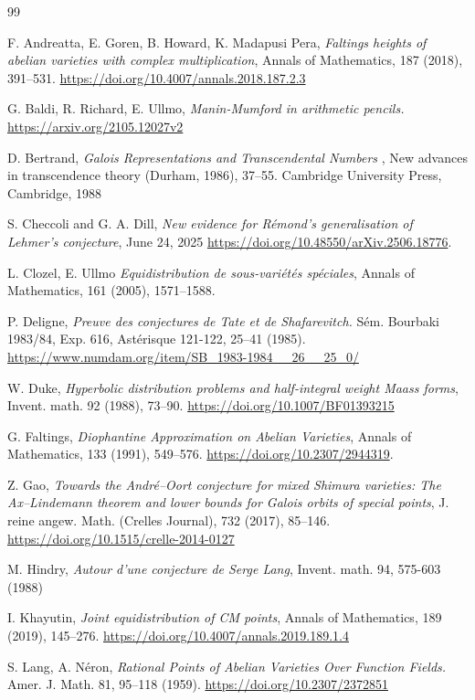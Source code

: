 \documentclass[12pt]{amsart}
\begin{document}
\begin{thebibliography}{99}

 F. Andreatta, E. Goren, B. Howard, K. Madapusi Pera, {\it Faltings heights of abelian varieties with complex multiplication}, Annals of Mathematics, 187 (2018), 391–531. \url{https://doi.org/10.4007/annals.2018.187.2.3}


 G. Baldi, R. Richard, E. Ullmo, {\it Manin-Mumford in arithmetic pencils.}  \url{https://arxiv.org/2105.12027v2}

 D. Bertrand, {\it Galois Representations and Transcendental Numbers
},
New advances in transcendence theory (Durham, 1986), 37–55.
Cambridge University Press, Cambridge, 1988

 S. Checcoli and G. A. Dill,
{\it New evidence for Rémond’s generalisation of Lehmer’s
conjecture}, June 24, 2025 \url{https://doi.org/10.48550/arXiv.2506.18776}.


 L. Clozel, E. Ullmo {\it Equidistribution de sous-variétés spéciales}, Annals of Mathematics, 161 (2005), 1571–1588. 

 P. Deligne, {\it Preuve des conjectures de Tate et de Shafarevitch.} Sém. Bourbaki 1983/84, Exp. 616, Astérisque 121-122, 25–41 (1985). \url{https://www.numdam.org/item/SB_1983-1984__26__25_0/}

 W. Duke, {\it Hyperbolic distribution problems and half-integral weight Maass forms}, Invent. math. 92 (1988), 73–90. \url{https://doi.org/10.1007/BF01393215}



 G. Faltings, {\it Diophantine Approximation on Abelian Varieties}, Annals of Mathematics, 133 (1991), 549–576. \url{https://doi.org/10.2307/2944319}.

 Z. Gao, {\it Towards the André–Oort conjecture for mixed Shimura varieties: The Ax–Lindemann theorem and lower bounds for Galois orbits of special points}, J. reine angew. Math. (Crelles Journal), 732 (2017), 85–146. \url{https://doi.org/10.1515/crelle-2014-0127}

 M. Hindry, {\it Autour d'une conjecture de Serge Lang},
Invent. math. 94, 575-603 (1988)

 I. Khayutin, {\it Joint equidistribution of CM points}, Annals of Mathematics, 189 (2019), 145–276. \url{https://doi.org/10.4007/annals.2019.189.1.4}

 S. Lang, A. Néron, {\it Rational Points of Abelian Varieties Over Function Fields.} Amer. J. Math. 81, 95–118 (1959). \url{https://doi.org/10.2307/2372851}


\end{thebibliography}
\end{document}
